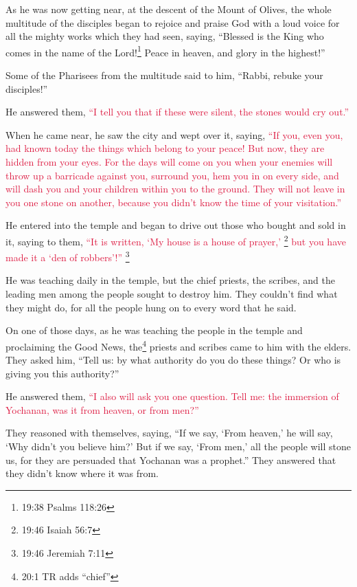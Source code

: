 \myverse{}As he was now getting near, at the descent of the Mount of Olives,
the whole multitude of the disciples began to rejoice and praise God with a loud voice for all the mighty
works which they had seen,
\myverse{}saying, “Blessed is the King who comes in the name of the Lord!\footnote{ 19:38 Psalms 118:26} Peace in heaven, and glory in the highest!”

\myverse{}Some of the Pharisees from the multitude said to him, “Rabbi,
rebuke your disciples!”

\myverse{}He answered them,
\textcolor{crimson}{“I tell you that if these were silent, the stones would cry out.”}

\myverse{}When he came near, he saw the city and wept over it,
\myverse{}saying,
\textcolor{crimson}{“If you, even you, had known today the things which belong to your peace! But now, they are hidden
	from your eyes.
}
\myverse{}\textcolor{crimson}{For the days will come on you when your enemies will throw up a barricade
	against you, surround you, hem you in on every side,
}
\myverse{}\textcolor{crimson}{and will dash you and your children within you to the ground. They will
	not leave in you one stone on another, because you didn’t know the time of your visitation.”}

\myverse{}He entered into the temple and began to drive out those who
bought and sold in it,
\myverse{}saying to them,
\textcolor{crimson}{“It is written, ‘My house is a house of prayer,’
}\footnote{ 19:46 Isaiah 56:7}
\textcolor{crimson}{but you have made it a ‘den of robbers’!”
}\footnote{ 19:46 Jeremiah 7:11}

\myverse{}He was teaching daily in the temple, but the chief priests,
the scribes, and the leading men among the people sought to destroy him.
\myverse{}They couldn’t find what they might do, for all the people hung on to every
word that he said.


\mychapter{} \myverse*{}On one of those days, as he was teaching the people in the temple
and proclaiming the Good News, the\footnote{20:1 TR adds “chief”} priests and scribes came to him with the elders.
\myverse{}They asked him, “Tell us: by what authority do you do these things? Or who
is giving you this authority?”

\myverse{}He answered them,
\textcolor{crimson}{“I also will ask you one question. Tell me:
}
\myverse{}\textcolor{crimson}{the immersion of Yochanan, was it from heaven, or from men?”}

\myverse{}They reasoned with themselves, saying, “If we say, ‘From heaven,’
he will say, ‘Why didn’t you believe him?’
\myverse{}But if we say, ‘From men,’ all the people will stone us, for they are persuaded
that Yochanan was a prophet.”
\myverse{}They answered that they didn’t know where it was from.

